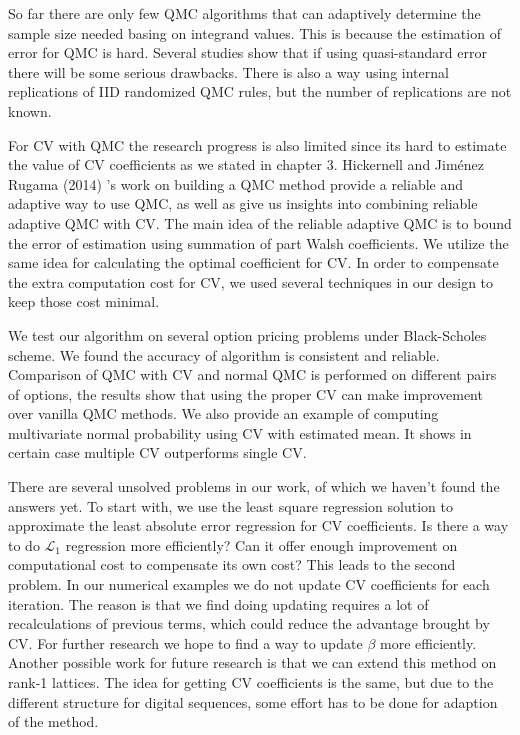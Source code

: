 

So far there are only few QMC algorithms that can adaptively determine the sample size needed basing on integrand values. 
This is because the estimation of error for QMC is hard. 
Several studies show that if using quasi-standard error there will be some serious drawbacks\cite{owen2006warnock}. 
There is also a way using internal replications of IID randomized QMC rules, but the number of replications are not known\cite{hickernell2005control}.

For CV with QMC the research progress is also limited since its hard to estimate the value of CV coefficients as we stated in chapter 3. 
Hickernell and Jim{\'e}nez Rugama (2014) \cite{hickernell2014reliable}'s work on building a QMC method provide a reliable and adaptive way to use QMC, as well as 
give us insights into combining reliable adaptive QMC with CV.    
The main idea of the reliable adaptive QMC is to bound the error of estimation using summation of part Walsh coefficients. 
We utilize the same idea for calculating the optimal coefficient for CV.  
In order to compensate the extra computation cost for CV, we used several techniques in our design to keep those cost minimal.

We test our algorithm on several option pricing problems under Black-Scholes scheme. We found the accuracy of algorithm is consistent and reliable. 
Comparison of QMC with CV and normal QMC is performed on different pairs of options, the results show that using the proper CV can make improvement over vanilla QMC methods. 
We also provide an example of computing multivariate normal probability using CV with estimated mean. It shows in certain case multiple CV outperforms single CV.       

\newpage


There are several unsolved problems in our work, of which we haven't found the answers yet. 
To start with, we use the least square regression solution to approximate the least absolute error regression for CV coefficients. 
Is there a way to do $\mathcal{L}_1$ regression more efficiently? Can it offer enough improvement on computational cost to compensate its own cost?    
This leads to the second problem. In our numerical examples we do not update CV coefficients for each iteration. 
The reason is that we find doing updating requires a lot of recalculations of previous terms, which could reduce the advantage brought by CV. For further research we hope to find a way to update $\beta$ more efficiently.      
Another possible work for future research is that we can extend this method on rank-1 lattices\cite{rugama2014adaptive}. 
The idea for getting CV coefficients is the same, but due to the different structure for digital sequences, some effort has to be done for adaption of the method.  

